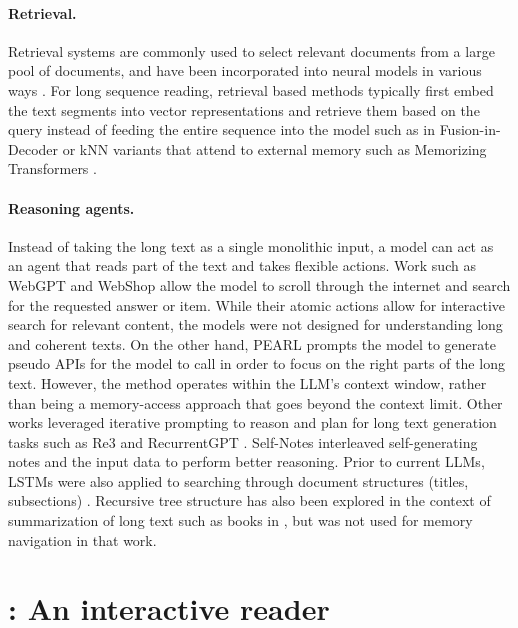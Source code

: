 \paragraph{Retrieval.}
Retrieval systems are commonly used to select relevant documents from a large pool of documents, and have been incorporated into neural models in various ways \citep{chen2017reading,dinan2018wizard,lewis2020retrieval}. For long sequence reading, retrieval based methods typically first  embed the text segments into vector representations and retrieve them based on the query instead of feeding the entire sequence into the model such as in Fusion-in-Decoder \cite{izacard2021leveraging} or kNN variants that attend to external memory such as Memorizing Transformers \citep{wu2022memorizing}.

\paragraph{Reasoning agents.}
Instead of taking the long text as a single monolithic input, a model can act as an agent that reads part of the text and takes flexible actions. Work such as WebGPT \citep{nakano2021webgpt} and WebShop \citep{yao2022webshop} allow the model to  scroll through the internet and search for the requested answer or item. While their atomic actions allow for interactive search for relevant content, the models were not designed for understanding long and coherent texts. On the other hand, PEARL \citep{sun2023pearl} prompts the model to generate pseudo APIs for the model to call in order to focus on the right parts of the long text. However, the method operates %
within the LLM's context window, rather than being a memory-access approach that goes beyond the context limit.
Other works leveraged iterative prompting to reason and plan for long text generation tasks such as Re3 \citep{yang2022re3} and RecurrentGPT \citep{zhou2023recurrentgpt}. Self-Notes \citep{lanchantin2023selfnote} interleaved self-generating notes and the input data to perform better reasoning.
Prior to current LLMs, LSTMs were also applied to searching through document structures (titles, subsections) \cite{geva2018learning}. 
Recursive tree structure has also been explored  in the context of summarization of long text such as books in  \citep{wu2021recursively}, but was not used for memory navigation in that work. 

\section{\sysname{}: An interactive reader}\label{sec:method}\label{interactivereading}


